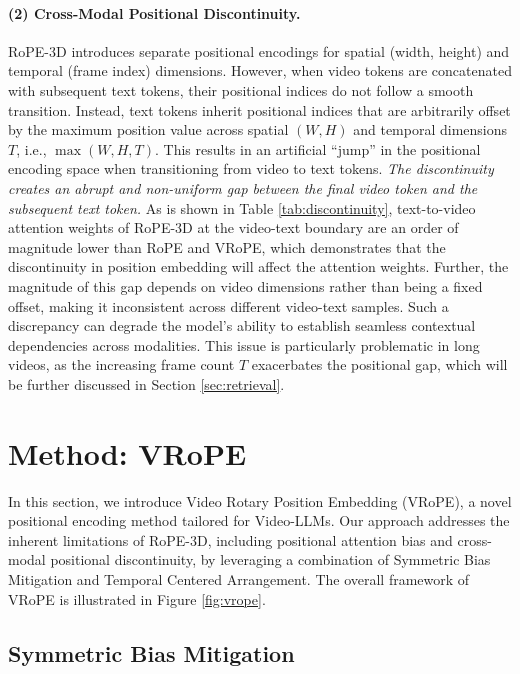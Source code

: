 \documentclass[11pt]{article}
\newcommand{\methodname}{VRoPE\xspace}
\begin{document}
\paragraph{(2) Cross-Modal Positional Discontinuity.}
RoPE-3D introduces separate positional encodings for spatial (width, height) and temporal (frame index) dimensions. However, when video tokens are concatenated with subsequent text tokens, their positional indices do not follow a smooth transition. Instead, text tokens inherit positional indices that are arbitrarily offset  by the maximum position value across spatial $(W, H)$ and temporal dimensions $T$, i.e., $\max(W, H, T)$.
This results in an artificial “jump” in the positional encoding space when transitioning from video to text tokens. \textit{The discontinuity creates an abrupt and non-uniform gap between the final video token and the subsequent text token.} As is shown in Table \ref{tab:discontinuity}, text-to-video attention weights of RoPE-3D at the video-text boundary are an order of magnitude lower than RoPE and \methodname, which demonstrates that the discontinuity in position embedding will affect the attention weights. Further, the magnitude of this gap depends on video dimensions rather than being a fixed offset, making it inconsistent across different video-text samples. 
Such a discrepancy can degrade the model’s ability to establish seamless contextual dependencies across modalities. This issue is particularly problematic in long videos, as the increasing frame count $T$ exacerbates the positional gap, which will be further discussed in Section \ref{sec:retrieval}.

\section{Method: \methodname}

In this section, we introduce Video Rotary Position Embedding (\methodname), a novel positional encoding method tailored for Video-LLMs. Our approach addresses the inherent limitations of RoPE-3D, including positional attention bias and cross-modal positional discontinuity, by leveraging a combination of Symmetric Bias Mitigation and Temporal Centered Arrangement.
The overall framework of \methodname is illustrated in Figure \ref{fig:vrope}.

\subsection{Symmetric Bias Mitigation}
\end{document}
